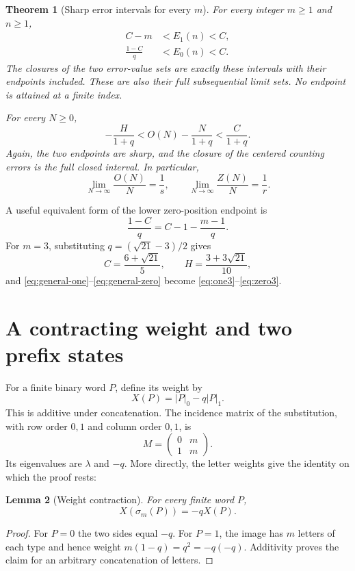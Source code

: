 \documentclass[11pt]{article}
\numberwithin{equation}{section}
\newtheorem{theorem}{Theorem}[section]
\newtheorem{lemma}[theorem]{Lemma}
\theoremstyle{definition}
\theoremstyle{remark}
\begin{document}
\begin{theorem}[Sharp error intervals for every $m$]\label{thm:general}
For every integer $m\ge1$ and $n\ge1$,
\begin{align}
C-m&<E_1(n)<C,\label{eq:general-one}\\
\frac{1-C}{q}&<E_0(n)<C.\label{eq:general-zero}
\end{align}
The closures of the two error-value sets are exactly these intervals
with their endpoints included. These are also their full subsequential
limit sets. No endpoint is attained at a finite index.

For every $N\ge0$,
\begin{equation}\label{eq:general-density}
-\frac{H}{1+q}<O(N)-\frac{N}{1+q}<\frac{C}{1+q}.
\end{equation}
Again, the two endpoints are sharp, and the closure of the centered
counting errors is the full closed interval. In particular,
\[
\lim_{N\to\infty}\frac{O(N)}N=\frac1s,\qquad
\lim_{N\to\infty}\frac{Z(N)}N=\frac1r.
\]
\end{theorem}

A useful equivalent form of the lower zero-position endpoint is
\begin{equation}\label{eq:zero-lower-alt}
\frac{1-C}{q}=C-1-\frac{m-1}{q}.
\end{equation}
For $m=3$, substituting $q=(\sqrt{21}-3)/2$ gives
\[
C=\frac{6+\sqrt{21}}5,\qquad
H=\frac{3+3\sqrt{21}}{10},
\]
and \eqref{eq:general-one}--\eqref{eq:general-zero} become
\eqref{eq:one3}--\eqref{eq:zero3}.

\section{A contracting weight and two prefix states}\label{sec:weight}

For a finite binary word $P$, define its weight by
\begin{equation}\label{eq:weight}
X(P)=|P|_0-q|P|_1.
\end{equation}
This is additive under concatenation. The incidence matrix of the
substitution, with row order $0,1$ and column order $0,1$, is
\[
M=\begin{pmatrix}0&m\\1&m\end{pmatrix}.
\]
Its eigenvalues are $\lambda$ and $-q$. More directly, the letter weights
give the identity on which the proof rests:
\begin{lemma}[Weight contraction]\label{lem:contraction}
For every finite word $P$,
\begin{equation}\label{eq:weight-contract}
X(\sigma_m(P))=-qX(P).
\end{equation}
\end{lemma}
\begin{proof}
For $P=0$ the two sides equal $-q$. For $P=1$, the image has $m$ letters
of each type and hence weight $m(1-q)=q^2=-q(-q)$. Additivity proves the
claim for an arbitrary concatenation of letters.
\end{proof}
\end{document}
